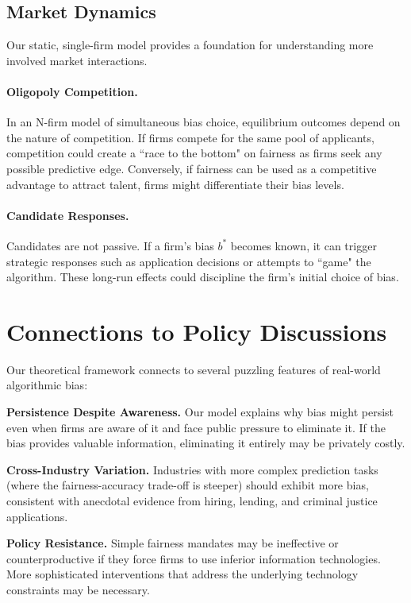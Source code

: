 \documentclass[12pt,a4paper]{article}
\theoremstyle{definition}
\theoremstyle{remark}
\begin{document}
\subsection{Market Dynamics}
Our static, single-firm model provides a foundation for understanding more involved market interactions.

\paragraph{Oligopoly Competition.} In an N-firm model of simultaneous bias choice, equilibrium outcomes depend on the nature of competition. If firms compete for the same pool of applicants, competition could create a ``race to the bottom" on fairness as firms seek any possible predictive edge. Conversely, if fairness can be used as a competitive advantage to attract talent, firms might differentiate their bias levels.

\paragraph{Candidate Responses.} Candidates are not passive. If a firm's bias $b^*$ becomes known, it can trigger strategic responses such as application decisions or attempts to ``game" the algorithm. These long-run effects could discipline the firm's initial choice of bias.

\section{Connections to Policy Discussions}

Our theoretical framework connects to several puzzling features of real-world algorithmic bias:

\textbf{Persistence Despite Awareness.} Our model explains why bias might persist even when firms are aware of it and face public pressure to eliminate it. If the bias provides valuable information, eliminating it entirely may be privately costly.

\textbf{Cross-Industry Variation.} Industries with more complex prediction tasks (where the fairness-accuracy trade-off is steeper) should exhibit more bias, consistent with anecdotal evidence from hiring, lending, and criminal justice applications.

\textbf{Policy Resistance.} Simple fairness mandates may be ineffective or counterproductive if they force firms to use inferior information technologies. More sophisticated interventions that address the underlying technology constraints may be necessary.
\end{document}
